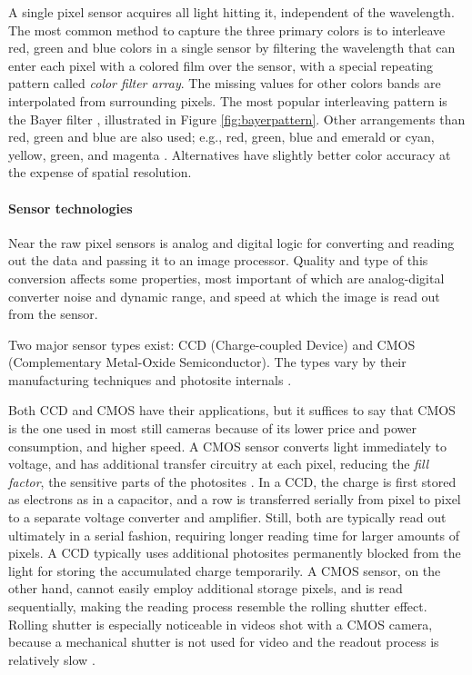 A single pixel sensor acquires all light hitting it, independent of the wavelength.
The most common method to capture the three primary colors is to interleave red, green and blue colors in a single sensor by filtering the wavelength that can enter each pixel with a colored film over the sensor, with a special repeating pattern called \emph{color filter array}.
The missing values for other colors bands are interpolated from surrounding pixels.
The most popular interleaving pattern is the Bayer filter \cite[p.~76]{szeliski10vision}, illustrated in Figure \ref{fig:bayerpattern}.
Other arrangements than red, green and blue are also used; e.g., red, green, blue and emerald or cyan, yellow, green, and magenta \cite{park2003implementing}.
Alternatives have slightly better color accuracy at the expense of spatial resolution.



\paragraph{Sensor technologies}
Near the raw pixel sensors is analog and digital logic for converting and reading out the data and passing it to an image processor.
Quality and type of this conversion affects some properties, most important of which are analog-digital converter noise and dynamic range, and speed at which the image is read out from the sensor.

Two major sensor types exist: CCD (Charge-coupled Device) and CMOS (Complementary Metal-Oxide Semiconductor).
The types vary by their manufacturing techniques and photosite internals \cite{nakamura2005image,taylor1998ccd,el2005cmos}.

Both CCD and CMOS have their applications, but it suffices to say that CMOS is the one used in most still cameras because of its lower price and power consumption, and higher speed.
A CMOS sensor converts light immediately to voltage, and has additional transfer circuitry at each pixel, reducing the \emph{fill factor}, the sensitive parts of the photosites \cite[p.~62]{nakamura2005image}.
In a CCD, the charge is first stored as electrons as in a capacitor, and a row is transferred serially from pixel to pixel to a separate voltage converter and amplifier.
Still, both are typically read out ultimately in a serial fashion, requiring longer reading time for larger amounts of pixels.
A CCD typically uses additional photosites permanently blocked from the light for storing the accumulated charge temporarily.
A CMOS sensor, on the other hand, cannot easily employ additional storage pixels, and is read sequentially, making the reading process resemble the rolling shutter effect.
Rolling shutter is especially noticeable in videos shot with a CMOS camera, because a mechanical shutter is not used for video and the readout process is relatively slow \cite{taylor1998ccd,caspeelectronic}.

